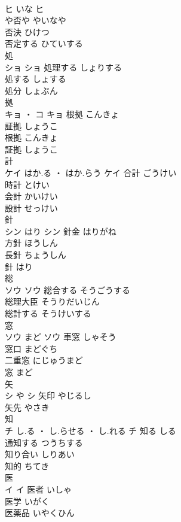 \documentclass[8pt]{extreport}
\begin{document}
\begin{CJK}{UTF8}{min}
\\	ヒ	いな	ヒ	
\\	や否や	やいなや	
\\	否決	ひけつ	
\\	否定する	ひていする	
\\	処	
\\	ショ		ショ	処理する	しょりする	
\\	処する	しょする	
\\	処分	しょぶん	
\\	拠	
\\	キョ ・ コ		キョ	根拠	こんきょ	
\\	証拠	しょうこ	
\\	根拠	こんきょ	
\\	証拠	しょうこ	
\\	計	
\\	ケイ	はか.る ・ はか.らう	ケイ	合計	ごうけい	
\\	時計	とけい	
\\	会計	かいけい	
\\	設計	せっけい	
\\	針	
\\	シン	はり	シン	針金	はりがね	
\\	方針	ほうしん	
\\	長針	ちょうしん	
\\	針	はり	
\\	総	
\\	ソウ		ソウ	総合する	そうごうする	
\\	総理大臣	そうりだいじん	
\\	総計する	そうけいする	
\\	窓	
\\	ソウ	まど	ソウ	車窓	しゃそう	
\\	窓口	まどぐち	
\\	二重窓	にじゅうまど	
\\	窓	まど	
\\	矢	
\\	シ	や	シ	矢印	やじるし	
\\	矢先	やさき	
\\	知	
\\	チ	し.る ・ し.らせる ・ し.れる	チ	知る	しる	
\\	通知する	つうちする	
\\	知り合い	しりあい	
\\	知的	ちてき	
\\	医	
\\	イ		イ	医者	いしゃ	
\\	医学	いがく	
\\	医薬品	いやくひん	

\end{CJK}
\end{document}
